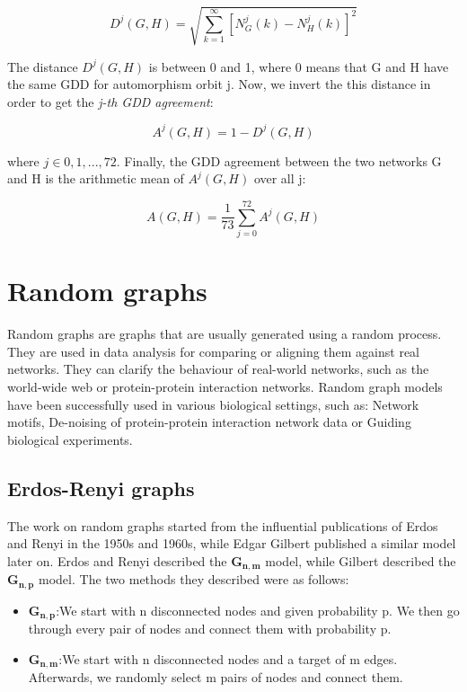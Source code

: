 $$ D^j(G,H) = \sqrt{\sum_{k=1}^{\infty}[N_G^j(k) - N_H^j(k)]^2} $$

The distance \( D^j(G,H) \) is between 0 and 1, where 0 means that G and H have
the same GDD for automorphism orbit j. Now, we invert the this distance in
order to get the \emph{j-th GDD agreement}:

$$ A^j(G, H) = 1 - D^j(G,H)$$

where \(j \in {0,1,...,72}\). Finally, the GDD agreement between the two
networks G and H is the arithmetic mean of \( A^j(G,H) \) over all j:

$$ A(G,H) = \frac{1}{73}\sum_{j=0}^{72}A^j(G,H) $$



\section{Random graphs}

Random graphs are graphs that are usually generated using a random process.
They are used in data analysis for comparing or aligning them against
real networks. They can clarify the behaviour of
real-world networks, such as the world-wide web or protein-protein interaction
networks. Random graph models have been successfully used in various biological
settings, such as: Network motifs\cite{milo2002network}, De-noising of
protein-protein interaction network data\cite{kuchaiev2009geometric} or Guiding
biological experiments\cite{lappe2003unraveling}.


\subsection{Erdos-Renyi graphs}

The work on random graphs started from the influential publications of
Erdos and Renyi in the 1950s and 1960s, while Edgar Gilbert published a similar
model later on. Erdos and Renyi described the \(\mathbf{G_{n,m}}\)
model\cite{erdHos1959random}, while Gilbert described the \(\mathbf{G_{n,p}}\)
model\cite{gilbert1959random}. The two methods they described were as
follows: 
\begin{itemize}
 \item \(\mathbf{G_{n,p}}\):We start with n disconnected nodes and given
probability p. We then go through every pair of nodes and connect them with
probability p.

 \item \(\mathbf{G_{n,m}}\):We start with n disconnected nodes and a target of
m edges. Afterwards, we randomly select m pairs of nodes and connect them.
\end{itemize}


